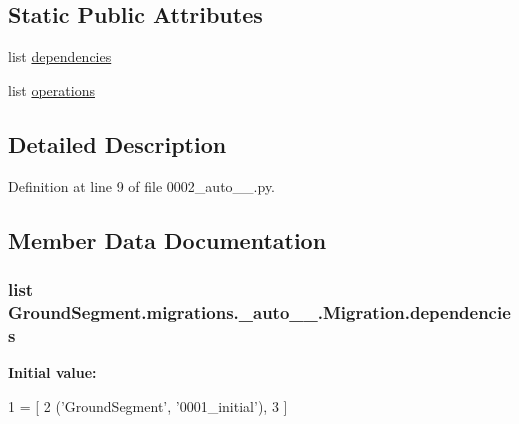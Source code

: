 \subsection*{Static Public Attributes}
\begin{DoxyCompactItemize}
\item 
list \hyperlink{class_ground_segment_1_1migrations_1_10002__auto__20161126__1037_1_1_migration_afef7a807fcdfc1a0b6b40255d1cd785c}{dependencies}
\item 
list \hyperlink{class_ground_segment_1_1migrations_1_10002__auto__20161126__1037_1_1_migration_a3af614388c347ff52dbaf98d9be3516d}{operations}
\end{DoxyCompactItemize}


\subsection{Detailed Description}


Definition at line 9 of file 0002\+\_\+auto\+\_\+\_.\+py.



\subsection{Member Data Documentation}
\hypertarget{class_ground_segment_1_1migrations_1_10002__auto__20161126__1037_1_1_migration_afef7a807fcdfc1a0b6b40255d1cd785c}{}
\subsubsection[{dependencies}]{\setlength{\rightskip}{0pt plus 5cm}list Ground\+Segment.\+migrations.\+\_\+auto\+\_\+\_.\+Migration.\+dependencies\hspace{0.3cm}{\ttfamily [static]}}\label{class_ground_segment_1_1migrations_1_10002__auto__20161126__1037_1_1_migration_afef7a807fcdfc1a0b6b40255d1cd785c}
{\bfseries Initial value\+:}
\begin{DoxyCode}
1 = [
2         (\textcolor{stringliteral}{'GroundSegment'}, \textcolor{stringliteral}{'0001\_initial'}),
3     ]
\end{DoxyCode}


